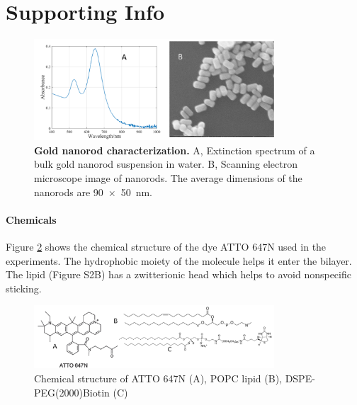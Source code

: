 \graphicspath{{chapters/c2_bilayer_efcs/si-figure/}}

\section{Supporting Info}
\begin{figure}%
  \centering
  \includegraphics[width=0.8\textwidth]{AuNR_uv-vis_SEM}
  \makeatletter
  \renewcommand{\fnum@figure}{\figurename~S\thefigure}
  \makeatother
  \caption{\textbf{Gold nanorod characterization.} A, Extinction spectrum of a bulk gold nanorod suspension in water. B, Scanning electron microscope image of nanorods.
  The average dimensions of the nanorods are \SI[product-units=repeat]{90x50}{\nm}.}
  \label{SIfig: AuNR_uv-vis}
\end{figure}

\paragraph*{Chemicals}
Figure \ref{SIfig:chemical} shows the chemical structure of the dye ATTO 647N used in the experiments.
The hydrophobic moiety of the molecule helps it enter the bilayer.
The lipid (Figure S2B) has a zwitterionic head which helps to avoid nonspecific sticking.
\begin{figure}%
  \centering
  \includegraphics[width=0.8\textwidth]{chemical_picture}
  \makeatletter
  \renewcommand{\fnum@figure}{\figurename~S\thefigure}
  \makeatother{}
  \caption{Chemical structure of ATTO 647N (A), POPC lipid (B), DSPE-PEG(2000)Biotin (C)}
  \label{SIfig:chemical}
\end{figure}

